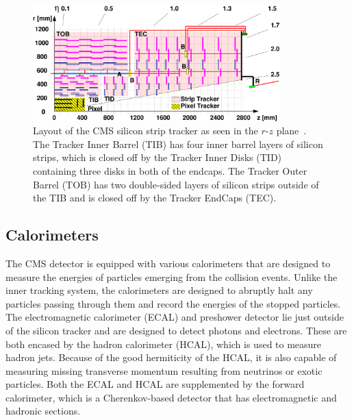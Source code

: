 \begin{figure}[htbp]
  \centering
  \includegraphics[width=0.85\textwidth]{fig/experiment/cms_siliconTracker.pdf}
  \caption[
    Layout of the CMS silicon strip tracker as seen in the $r$-$z$ plane.
    The Tracker Inner Barrel (TIB) has four inner barrel layers of silicon strips, which is closed off by the Tracker Inner Disks (TID) containing three disks in both of the endcaps.
    The Tracker Outer Barrel (TOB) has two double-sided layers of silicon strips outside of the TIB and is closed off by the Tracker EndCaps (TEC).
  ]{
    Layout of the CMS silicon strip tracker as seen in the $r$-$z$ plane~\cite{Chatrchyan:1211825}.
    The Tracker Inner Barrel (TIB) has four inner barrel layers of silicon strips, which is closed off by the Tracker Inner Disks (TID) containing three disks in both of the endcaps.
    The Tracker Outer Barrel (TOB) has two double-sided layers of silicon strips outside of the TIB and is closed off by the Tracker EndCaps (TEC).
  }
  \label{fig:CMSsilicon}
\end{figure}

\subsection{Calorimeters}
\label{subsec:calorimeter}

The CMS detector is equipped with various calorimeters that are designed to measure the energies of particles emerging from the collision events.
Unlike the inner tracking system, the calorimeters are designed to abruptly halt any particles passing through them and record the energies of the stopped particles.
The electromagnetic calorimeter (ECAL) and preshower detector lie just outside of the silicon tracker and are designed to detect photons and electrons.
These are both encased by the hadron calorimeter (HCAL), which is used to measure hadron jets.
Because of the good hermiticity of the HCAL, it is also capable of measuring missing transverse momentum resulting from neutrinos or exotic particles.
Both the ECAL and HCAL are supplemented by the forward calorimeter, which is a Cherenkov-based detector that has electromagnetic and hadronic sections.

